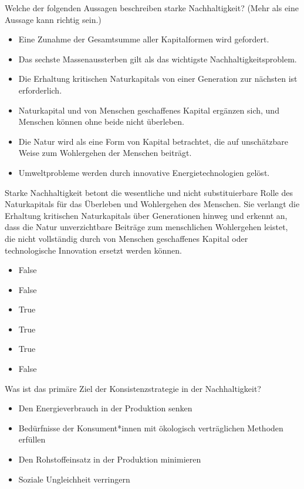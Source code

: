 \documentclass[
  nswissgerman,
  a4paper,
  DIV=11,
  numbers=noendperiod,
  oneside,
  openany]{scrreprt}
\providecommand{\tightlist}{%
  \setlength{\itemsep}{0pt}\setlength{\parskip}{0pt}}
\begin{document}
Welche der folgenden Aussagen beschreiben starke Nachhaltigkeit? (Mehr
als eine Aussage kann richtig sein.)

\begin{itemize}
\tightlist
\item[$\square$]
  Eine Zunahme der Gesamtsumme aller Kapitalformen wird gefordert.
\item[$\square$]
  Das sechste Massenaussterben gilt als das wichtigste
  Nachhaltigkeitsproblem.
\item[$\square$]
  Die Erhaltung kritischen Naturkapitals von einer Generation zur
  nächsten ist erforderlich.
\item[$\square$]
  Naturkapital und von Menschen geschaffenes Kapital ergänzen sich, und
  Menschen können ohne beide nicht überleben.
\item[$\square$]
  Die Natur wird als eine Form von Kapital betrachtet, die auf
  unschätzbare Weise zum Wohlergehen der Menschen beiträgt.
\item[$\square$]
  Umweltprobleme werden durch innovative Energietechnologien gelöst.
\end{itemize}

Starke Nachhaltigkeit betont die wesentliche und nicht substituierbare
Rolle des Naturkapitals für das Überleben und Wohlergehen des Menschen.
Sie verlangt die Erhaltung kritischen Naturkapitals über Generationen
hinweg und erkennt an, dass die Natur unverzichtbare Beiträge zum
menschlichen Wohlergehen leistet, die nicht vollständig durch von
Menschen geschaffenes Kapital oder technologische Innovation ersetzt
werden können.

\begin{itemize}
\tightlist
\item
  False
\item
  False
\item
  True
\item
  True
\item
  True
\item
  False
\end{itemize}

Was ist das primäre Ziel der Konsistenzstrategie in der Nachhaltigkeit?

\begin{itemize}
\tightlist
\item[$\square$]
  Den Energieverbrauch in der Produktion senken
\item[$\square$]
  Bedürfnisse der Konsument*innen mit ökologisch verträglichen Methoden
  erfüllen
\item[$\square$]
  Den Rohstoffeinsatz in der Produktion minimieren
\item[$\square$]
  Soziale Ungleichheit verringern
\end{itemize}
\end{document}
